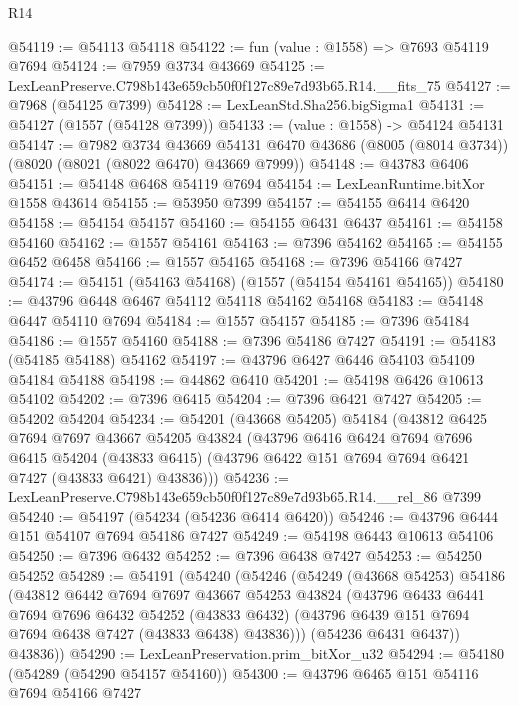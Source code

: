 \begin{lexlean}{R14}
\begin{coremodule}
@54119 := @54113 @54118
@54122 := fun (value : @1558) => @7693 @54119 @7694
@54124 := @7959 @3734 @43669
@54125 := LexLeanPreserve.C798b143e659cb50f0f127c89e7d93b65.R14.__fits_75
@54127 := @7968 (@54125 @7399)
@54128 := LexLeanStd.Sha256.bigSigma1
@54131 := @54127 (@1557 (@54128 @7399))
@54133 := (value : @1558) -> @54124 @54131
@54147 := @7982
    @3734
    @43669
    @54131
    @6470
    @43686
    (@8005 (@8014 @3734))
    (@8020 (@8021 (@8022 @6470) @43669 @7999))
@54148 := @43783 @6406
@54151 := @54148 @6468 @54119 @7694
@54154 := LexLeanRuntime.bitXor @1558 @43614
@54155 := @53950 @7399
@54157 := @54155 @6414 @6420
@54158 := @54154 @54157
@54160 := @54155 @6431 @6437
@54161 := @54158 @54160
@54162 := @1557 @54161
@54163 := @7396 @54162
@54165 := @54155 @6452 @6458
@54166 := @1557 @54165
@54168 := @7396 @54166 @7427
@54174 := @54151 (@54163 @54168) (@1557 (@54154 @54161 @54165))
@54180 := @43796 @6448 @6467 @54112 @54118 @54162 @54168
@54183 := @54148 @6447 @54110 @7694
@54184 := @1557 @54157
@54185 := @7396 @54184
@54186 := @1557 @54160
@54188 := @7396 @54186 @7427
@54191 := @54183 (@54185 @54188) @54162
@54197 := @43796 @6427 @6446 @54103 @54109 @54184 @54188
@54198 := @44862 @6410
@54201 := @54198 @6426 @10613 @54102
@54202 := @7396 @6415
@54204 := @7396 @6421 @7427
@54205 := @54202 @54204
@54234 := @54201
    (@43668 @54205)
    @54184
    (@43812
      @6425
      @7694
      @7697
      @43667
      @54205
      @43824
      (@43796
        @6416
        @6424
        @7694
        @7696
        @6415
        @54204
        (@43833 @6415)
        (@43796 @6422 @151 @7694 @7694 @6421 @7427 (@43833 @6421) @43836)))
@54236 := LexLeanPreserve.C798b143e659cb50f0f127c89e7d93b65.R14.__rel_86 @7399
@54240 := @54197 (@54234 (@54236 @6414 @6420))
@54246 := @43796 @6444 @151 @54107 @7694 @54186 @7427
@54249 := @54198 @6443 @10613 @54106
@54250 := @7396 @6432
@54252 := @7396 @6438 @7427
@54253 := @54250 @54252
@54289 := @54191
    (@54240
      (@54246
        (@54249
          (@43668 @54253)
          @54186
          (@43812
            @6442
            @7694
            @7697
            @43667
            @54253
            @43824
            (@43796
              @6433
              @6441
              @7694
              @7696
              @6432
              @54252
              (@43833 @6432)
              (@43796 @6439 @151 @7694 @7694 @6438 @7427 (@43833 @6438) @43836)))
          (@54236 @6431 @6437))
        @43836))
@54290 := LexLeanPreservation.prim_bitXor_u32
@54294 := @54180 (@54289 (@54290 @54157 @54160))
@54300 := @43796 @6465 @151 @54116 @7694 @54166 @7427

\end{coremodule}
\end{lexlean}
